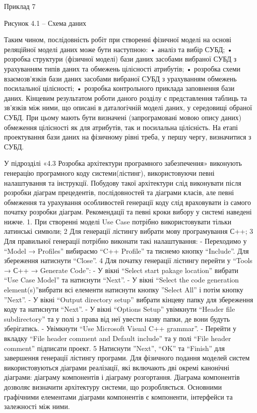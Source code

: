 Приклад 7 












Рисунок 4.1 – Схема даних 

Таким чином, послідовність робіт при створенні фізичної моделі на основі реляційної моделі даних може бути наступною:
	 • аналіз та вибір СУБД; 
	• розробка структури (фізичної моделі) бази даних засобами вибраної СУБД з урахуванням типів даних та обмежень цілісності атрибутів; 
	• розробка схеми взаємозв’язків бази даних засобами вибраної СУБД з урахуванням обмежень посилальної цілісності; 
	• розробка контрольного приклада заповнення бази даних. 
	Кінцевим результатом роботи даного розділу є представлення таблиць та зв’язків між ними, що описані в даталогічній моделі даних, у середовищі обраної СУБД. При цьому мають бути визначені (запрограмовані мовою опису даних) обмеження цілісності як для атрибутів, так и посилальна цілісність. На етапі проектування бази даних на фізичному рівні треба, у першу чергу, визначитися з СУБД. 

У підрозділі «4.3 Розробка архітектури програмного забезпечення»  виконують генерацію програмного коду системи(лістинг), використовуючи певні налаштування та інструкції.
Побудову такої архітектури слід виконувати після розробки діаграм прецедентів, послідовностей та діаграми класів, але певні обмеження та урахування особливостей генерації коду слід враховувати із самого початку розробки діаграм. 
 Рекомендації та певні кроки вибору у системі наведені нижче.  
1. При створенні моделі Use Case потрібно використовувати тільки латинські символи;
2  Для генерації лістингу вибрати мову програмування С++;
3  Для правильної генерації потрібно виконати такі налаштування:
-  Переходимо у “Model → Profiles” вибираємо “C++ Profile” та тиснемо кнопку “Include”. Для збереження натиснути “Close”.
4  Для початку генерації лістингу перейти  у “Tools → С++ → Generate Code”: 
-  У вікні “Select start pakage location” вибрати “Use Case Model” та натиснути “Next”.
-  У вікні “Select the code generation element(s)”вибрати всі елементи натиснути  кнопку ”Select All” і потім кнопку  ”Next”.
-  У вікні “Output directory setup” вибрати кінцеву папку для збереження коду та натиснути “Next”.
-  У вікні “Options Setup” увімкнути “Header file subdirectory” та у полі з права від неї увести назву папки, де вони будуть зберігатись.
-  Увімкнути “Use Microsoft Visual C++ grammar”.
-  Перейти у вкладку “File header comment and Default include” та у полі “File header comment” підписати проект.
5  Натиснути ”Next”, “OK” та “Finish” для завершення генерації лістингу програми.
Для фізичного подання моделей систем використовуються діаграми реалізації, які включають дві окремі канонічні діаграми: діаграму компонентів і діаграму розгортання. 
Діаграма компонентів дозволяє визначити архітектуру системи, що розробляється. Основними графічними елементами діаграми компонентів є компоненти, інтерфейси та залежності між ними. 
 
